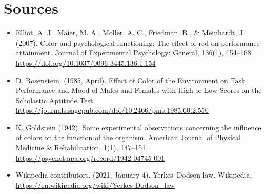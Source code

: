 \documentclass[12pt, a4]{article}
\begin{document}
\section*{Sources}
\begin{itemize}
    \item Elliot, A. J., Maier, M. A., Moller, A. C., Friedman, R., \& Meinhardt, J. (2007). Color and psychological functioning: The effect of red on performance attainment. Journal of Experimental Psychology: General, 136(1), 154–168. \url{https://doi.org/10.1037/0096-3445.136.1.154}
    \item D. Rosenstein. (1985, April). Effect of Color of the Environment on Task Performance and Mood of Males and Females with High or Low Scores on the Scholastic Aptitude Test. \url{https://journals.sagepub.com/doi/10.2466/pms.1985.60.2.550}
    \item K. Goldstein (1942). Some experimental observations concerning the influence of colors on the function of the organism. American Journal of Physical Medicine \& Rehabilitation, 1(1), 147–151. \url{https://psycnet.apa.org/record/1942-04745-001}
    \item Wikipedia contributors. (2021, January 4). Yerkes–Dodson law. Wikipedia. \url{https://en.wikipedia.org/wiki/Yerkes-Dodson_law}
\end{itemize}
\end{document}
